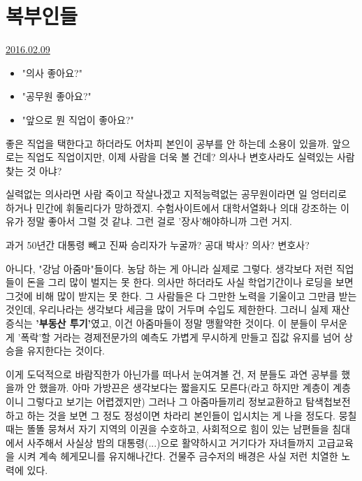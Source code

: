 \section{복부인들}
\href{https://www.kockoc.com/Apoc/629218}{2016.02.09}

\vspace{5mm}
\begin{itemize}
    \item[] "의사 좋아요?"
    \item[] "공무원 좋아요?"
    \item[] "앞으로 뭔 직업이 좋아요?"
\end{itemize}
\vspace{5mm}

좋은 직업을 택한다고 하더라도 어차피 본인이 공부를 안 하는데 소용이 있을까.
앞으로는 직업도 직업이지만, 이제 사람을 더욱 볼 건데?
의사나 변호사라도 실력있는 사람 찾는 것 아냐?
\vspace{5mm}

실력없는 의사라면 사람 죽이고 작살나겠고
지적능력없는 공무원이라면 일 엉터리로 하거나 민간에 휘둘리다가 망하겠지.
수험사이트에서 대학서열화나 의대 강조하는 이유가 정말 좋아서 그럴 것 같냐.
그런 걸로 '장사'해야하니까 그런 거지.
\vspace{5mm}

과거 50년간 대통령 빼고 진짜 승리자가 누굴까?
공대 박사? 의사? 변호사?
\vspace{5mm}

아니다, "강남 아줌마"들이다.
농담 하는 게 아니라 실제로 그렇다.
생각보다 저런 직업들이 돈을 그리 많이 벌지는 못 한다.
의사만 하더라도 사실 학업기간이나 로딩을 보면 그것에 비해 많이 받지는 못 한다.
그 사람들은 다 그만한 노력을 기울이고 그만큼 받는 것인데, 우리나라는 생각보다 세금을 많이 거두며 수입도 제한한다.
그러니 실제 재산 증식는 \textbf{'부동산 투기'}였고, 이건 아줌마들이 정말 맹활약한 것이다.
이 분들이 무서운 게 '폭락'할 거라는 경제전문가의 예측도 가볍게 무시하게 만들고 집값 유지를 넘어 상승을 유지한다는 것이다.
\vspace{5mm}

이게 도덕적으로 바람직한가 아닌가를 떠나서 눈여겨볼 건, 저 분들도 과연 공부를 했을까 안 했을까.
아마 가방끈은 생각보다는 짧을지도 모른다(라고 하지만 계층이 계층이니 그렇다고 보기는 어렵겠지만)
그러나 그 아줌마들끼리 정보교환하고 탐색첩보전하고 하는 것을 보면 그 정도 정성이면 차라리 본인들이 입시치는 게 나을 정도다.
뭉칠 때는 똘똘 뭉쳐서 자기 지역의 이권을 수호하고,
사회적으로 힘이 있는 남편들을 침대에서 사주해서 사실상 밤의 대통령(...)으로 활약하시고
거기다가 자녀들까지 고급교육을 시켜 계속 헤게모니를 유지해나간다.
건물주 금수저의 배경은 사실 저런 치열한 노력에 있다.
\vspace{5mm}

